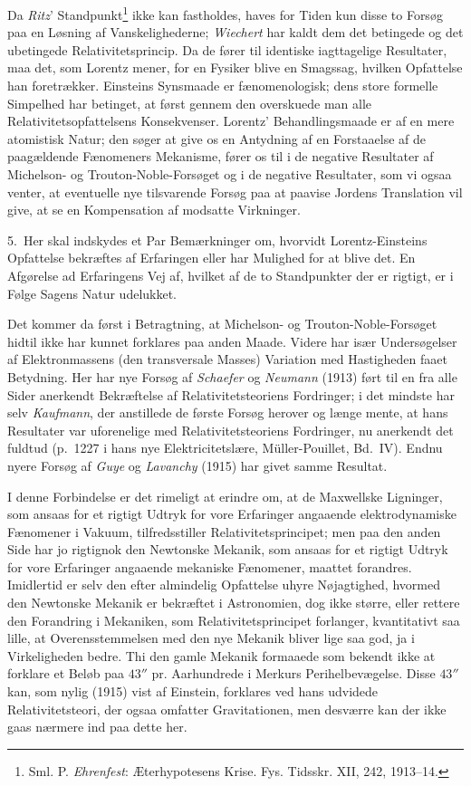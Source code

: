 \documentclass[12pt,a4paper]{article}
\newcommand{\opage}[1]{\marginnote{\footnotesize\textit{[#1]}}}
\begin{document}
Da \emph{Ritz}' Standpunkt\footnote{Sml. P. \emph{Ehrenfest}:
Æterhypotesens Krise. Fys. Tidsskr. XII, 242, 1913--14.} ikke kan
fastholdes, haves for Tiden kun disse to Forsøg paa en Løsning af
Vanskelighederne; \emph{Wiechert} har kaldt dem det betingede og det
ubetingede Relativitetsprincip. Da de fører til identiske iagttagelige
Resultater, maa det, som Lorentz mener, for en Fysiker blive en
Smagssag, hvilken Opfattelse han foretrækker. Einsteins Synsmaade er
fænomenologisk; dens store formelle Simpelhed har betinget, at først
gennem den overskuede man alle Relativitetsopfattelsens Konsekvenser.
Lorentz' Behandlingsmaade er af en mere atomistisk Natur; den søger at
give os en Antydning af en Forstaaelse af de paagældende Fænomeners
Mekanisme, fører os til i de negative Resultater af Michelson- og
Trouton-Noble-Forsøget og i de negative Resultater, som vi ogsaa
venter, at eventuelle nye tilsvarende Forsøg paa at paavise Jordens
Translation vil give, at se en Kompensation af modsatte Virkninger.

5.\ Her skal indskydes et Par Bemærkninger om, hvorvidt
Lorentz-Einsteins Opfattelse bekræftes af Erfaringen eller har
Mulighed for at blive det. En Afgørelse ad Erfaringens Vej af, hvilket
af de to Standpunkter der er \guillemotright
rigtigt\guillemotleft{}, er i Følge Sagens Natur udelukket.

Det kommer da først i Betragtning, at Michelson- og
Trouton-Noble-Forsøget hidtil ikke har kunnet forklares paa anden
Maade. Videre har især Undersøgelser af Elektronmassens (den
transversale Masses) Variation med Hastigheden faaet Betydning. Her har
nye Forsøg af \emph{Schaefer} og \emph{Neumann} (1913) ført til en fra
alle Sider anerkendt Bekræftelse af Relativitetsteoriens Fordringer; i
det mindste har selv \emph{Kaufmann}, der anstillede de første Forsøg
herover og længe mente, at hans Resultater var uforenelige med
Relativitetsteoriens Fordringer, nu anerkendt det fuldtud (p.~1227 i
hans nye Elektricitetslære, Müller-Pouillet, Bd.~IV). Endnu nyere
Forsøg af \emph{Guye} og \emph{Lavanchy} (1915) har givet samme
Resultat.

I denne Forbindelse er det rimeligt at erindre om, at de Maxwellske
Ligninger, som ansaas for et rigtigt Udtryk for vore Erfaringer
angaaende elektrodynamiske Fænomener i Vakuum, tilfredsstiller
Relativitetsprincipet; men paa den anden Side har jo rigtignok den
\opage{24} %
Newtonske Mekanik, som ansaas for et rigtigt Udtryk for vore
Erfaringer angaaende mekaniske Fænomener, maattet forandres.
Imidlertid er selv den efter almindelig Opfattelse uhyre Nøjagtighed,
hvormed den Newtonske Mekanik er bekræftet i Astronomien, dog ikke
større, eller rettere den Forandring i Mekaniken, som
Relativitetsprincipet forlanger, kvantitativt saa lille, at
Overensstemmelsen med den nye Mekanik bliver lige saa god, ja i
Virkeligheden bedre. Thi den gamle Mekanik formaaede som bekendt ikke
at forklare et Beløb paa $43''$ pr. Aarhundrede i Merkurs
Perihelbevægelse. Disse $43''$ kan, som nylig (1915) vist af Einstein,
forklares ved hans udvidede Relativitetsteori, der ogsaa omfatter
Gravitationen, men desværre kan der ikke gaas nærmere ind paa dette
her.
\end{document}
